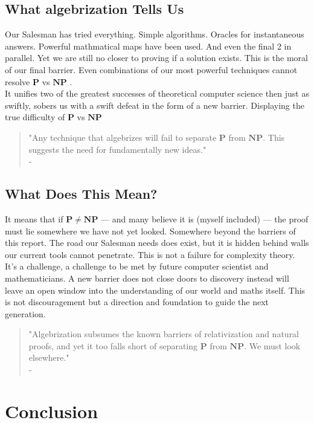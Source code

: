 \documentclass[12pt]{report}
\begin{document}
\section{What algebrization Tells Us}
Our Salesman has tried everything.
Simple algorithms.
Oracles for instantaneous answers.
Powerful mathmatical maps have been used.
And even the final 2 in parallel.
Yet we are still no closer to proving if a solution exists.
This is the moral of our final barrier.
Even combinations of our most powerful techniques cannot resolve $\mathbf{P}$ vs $\mathbf{NP}$ \citep{arora2008algebrization, arora2009}.\\
\vspace{0.3cm}
It unifies two of the greatest successes of theoretical computer science then just as swiftly, sobers us with a swift defeat in the form of a new barrier.
Displaying the true difficulty of $\mathbf{P}$ vs $\mathbf{NP}$
\begin{quote}
    "Any technique that algebrizes will fail to separate $\mathbf{P}$ from $\mathbf{NP}$. This suggests the need for fundamentally new ideas."\\
    - \cite[Ch. 20.4]{arora2009}
\end{quote}
\vspace{0.3cm}

\section{What Does This Mean?}
It means that if $\mathbf{P \ne NP}$ --- and many believe it is (myself included) --- the proof must lie somewhere we have not yet looked.
Somewhere beyond the barriers of this report.
The road our Salesman needs does exist, but it is hidden behind walls our current tools cannot penetrate.
This is not a failure for complexity theory.
It's a challenge, a challenge to be met by future computer scientist and mathematicians.
A new barrier does not close doors to discovery instead will leave an open window into the understanding of our world and maths itself.
This is not discouragement but a direction and foundation to guide the next generation.
\begin{quote}
    "Algebrization subsumes the known barriers of relativization and natural proofs, and yet it too falls short of separating $\mathbf{P}$ from $\mathbf{NP}$. We must look elsewhere."\\
    -\cite{arora2008algebrization}
\end{quote}

\newpage
\chapter{Conclusion}
\end{document}
